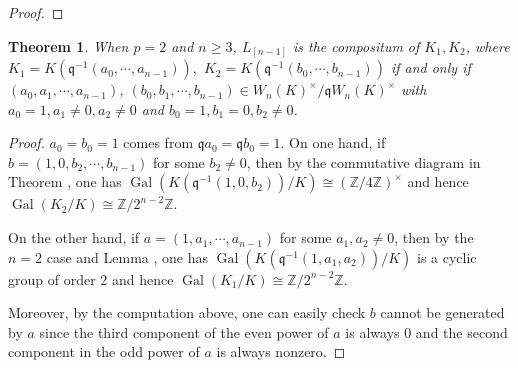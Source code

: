 \documentclass{proc-l}
\newtheorem{theorem}{Theorem}[section]
\theoremstyle{definition}
\theoremstyle{remark}
\numberwithin{equation}{section}
\DeclareMathOperator{\Gal}{Gal}
\begin{document}
{\begin{proof}
\end{proof}
\begin{theorem}{\label{2.17}}
When $p=2$ and $n\geq 3$, $L_{[n-1]}$ is the compositum of $K_1,K_2$,
where $K_1=K(\mathfrak q^{-1}(a_0,\cdots,a_{n-1})),$ $K_2=K(\mathfrak q^{-1}(b_0,\cdots,b_{n-1}))$ if and only if $(a_0,a_1,\cdots,a_{n-1})$, $(b_0,b_1,\cdots,b_{n-1})\in W_n(K)^\times/\mathfrak qW_n(K)^\times$ with $a_0=1,a_1\neq0,a_2\neq0$ and $b_0=1,b_1=0,b_2\neq0$.

\center{}

\end{theorem}
\begin{proof}
$a_0=b_0=1$ comes from $\mathfrak qa_0=\mathfrak qb_0=1$. On one hand, if $b=(1,0,b_2,\cdots,b_{n-1})$ for some $b_2\neq0$, then by the commutative diagram in Theorem \boxed{\ref{038}}, one has $\Gal(K(\mathfrak q^{-1}(1,0,b_2))/K)\cong(\mathbb Z/4\mathbb Z)^\times$ and hence $\Gal(K_2/K)\cong\mathbb Z/2^{n-2}\mathbb Z$.

On the other hand, if $a=(1,a_1,\cdots,a_{n-1})$ for some $a_1,a_2\neq0$, then by the $n=2$ case and Lemma \boxed{\ref{312}}, one has $\Gal(K(\mathfrak q^{-1}(1,a_1,a_2))/K)$ is a cyclic group of order $2$ and hence $\Gal(K_1/K)\cong\mathbb Z/2^{n-2}\mathbb Z$.

Moreover, by the computation above, one can easily check $b$ cannot be generated by $a$ since the third component of the even power of $a$ is always 0 and the second component in the odd power of $a$ is always nonzero. 


\end{proof}}
\end{document}

